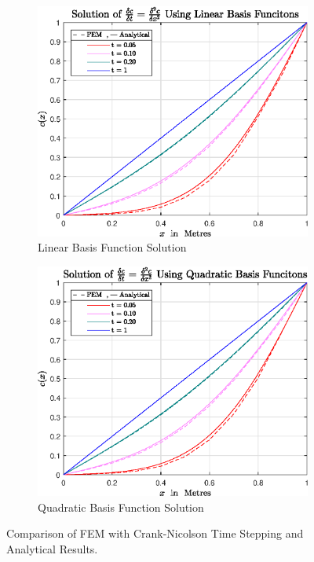 \documentclass[11pt]{article}
\begin{document}
\begin{figure}[h!] 
        \centering
        \begin{subfigure}[b]{0.475\textwidth}
            \centering
            \includegraphics[width=\textwidth]{epsQ1a}
            \caption[]%
            {{\small Linear Basis Function Solution }}    
            \label{fig:q1alin}
        \end{subfigure}
        \hfill
        \begin{subfigure}[b]{0.475\textwidth}  
            \centering 
            \includegraphics[width=\textwidth]{epsQ1aQuad}
            \caption[]%
            {{\small Quadratic Basis Function Solution}}    
            \label{fig:q1aquad}
        \end{subfigure}
        \caption[ The Effect of Mesh Size on Temperature Resolution ]
        {\small Comparison of FEM with Crank-Nicolson Time Stepping and Analytical Results.} 
        \label{fig:q1a}
\end{figure}
\end{document}
